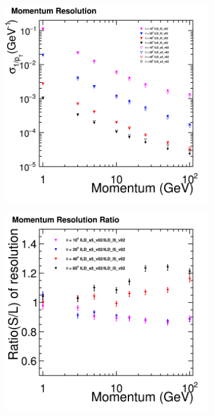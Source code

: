 \begin{figure}[htbp]
\begin{subfigure}{0.49\hsize} 
 \includegraphics[width=\hsize]{Performance/fig/PResolution_compare_v02-00-02_New_ILD_ls5_v02.png}
 \caption{ \label{fig:perf:trk_pt}}
 \end{subfigure}
\begin{subfigure}{0.49\hsize} 
 \includegraphics[width=\hsize]{Performance/fig/PResolution_Ratio_v02-00-02_New_ILD_ls5_v02.png}

\end{subfigure}
\end{figure}
